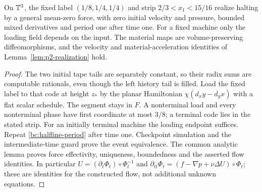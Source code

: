 \begin{theorem}\label{bc:halfline-event}
On $\mathbb T^3$, the fixed label $(1/8,1/4,1/4)$ and strip
$2/3<x_1<15/16$ realize halting by a general mean-zero force, with zero
initial velocity and pressure, bounded mixed derivatives and period one
after time one. For a fixed machine only the loading field depends on the
input. The material maps are volume-preserving diffeomorphisms, and the
velocity and material-acceleration identities of
Lemma~\ref{lem:p2-realization} hold.
\end{theorem}
\begin{proof}\label{bc:halfline-event-proof}
The two initial tape tails are separately constant, so their radix sums
are computable rationals, even though the left history tail is filled.
Load the fixed label to that code at height $z_*$ by the planar Hamiltonian
$\chi(d_x y-d_y x)$ with a flat scalar schedule. The segment stays in $F$.
A nonterminal load and every nonterminal phase have first coordinate at
most $3/8$; a terminal code lies in the stated strip. For an initially
terminal machine the loading endpoint suffices. Repeat
\eqref{bc:halfline-period} after time one. Checkpoint simulation and the
intermediate-time guard prove the event equivalence. The common analytic
lemma proves force effectivity, uniqueness, boundedness and the asserted
flow identities. In particular $U=(\partial_t\Phi_t)\circ\Phi_t^{-1}$ and
$\partial_{tt}\Phi_t=(f-\nabla p+\nu\Delta U)\circ\Phi_t$; these are
identities for the constructed flow, not additional unknown equations.
\end{proof}
